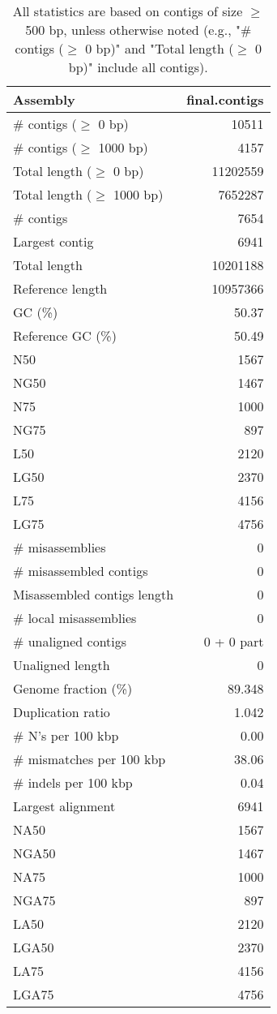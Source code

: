 \documentclass[12pt,a4paper]{article}
\begin{document}
\begin{table}[ht]
\begin{center}
\caption{All statistics are based on contigs of size $\geq$ 500 bp, unless otherwise noted (e.g., "\# contigs ($\geq$ 0 bp)" and "Total length ($\geq$ 0 bp)" include all contigs).}
\begin{tabular}{|l*{1}{|r}|}
\hline
Assembly & final.contigs \\ \hline
\# contigs ($\geq$ 0 bp) & 10511 \\ \hline
\# contigs ($\geq$ 1000 bp) & 4157 \\ \hline
Total length ($\geq$ 0 bp) & 11202559 \\ \hline
Total length ($\geq$ 1000 bp) & 7652287 \\ \hline
\# contigs & 7654 \\ \hline
Largest contig & 6941 \\ \hline
Total length & 10201188 \\ \hline
Reference length & 10957366 \\ \hline
GC (\%) & 50.37 \\ \hline
Reference GC (\%) & 50.49 \\ \hline
N50 & 1567 \\ \hline
NG50 & 1467 \\ \hline
N75 & 1000 \\ \hline
NG75 & 897 \\ \hline
L50 & 2120 \\ \hline
LG50 & 2370 \\ \hline
L75 & 4156 \\ \hline
LG75 & 4756 \\ \hline
\# misassemblies & 0 \\ \hline
\# misassembled contigs & 0 \\ \hline
Misassembled contigs length & 0 \\ \hline
\# local misassemblies & 0 \\ \hline
\# unaligned contigs & 0 + 0 part \\ \hline
Unaligned length & 0 \\ \hline
Genome fraction (\%) & 89.348 \\ \hline
Duplication ratio & 1.042 \\ \hline
\# N's per 100 kbp & 0.00 \\ \hline
\# mismatches per 100 kbp & 38.06 \\ \hline
\# indels per 100 kbp & 0.04 \\ \hline
Largest alignment & 6941 \\ \hline
NA50 & 1567 \\ \hline
NGA50 & 1467 \\ \hline
NA75 & 1000 \\ \hline
NGA75 & 897 \\ \hline
LA50 & 2120 \\ \hline
LGA50 & 2370 \\ \hline
LA75 & 4156 \\ \hline
LGA75 & 4756 \\ \hline
\end{tabular}
\end{center}
\end{table}
\end{document}
